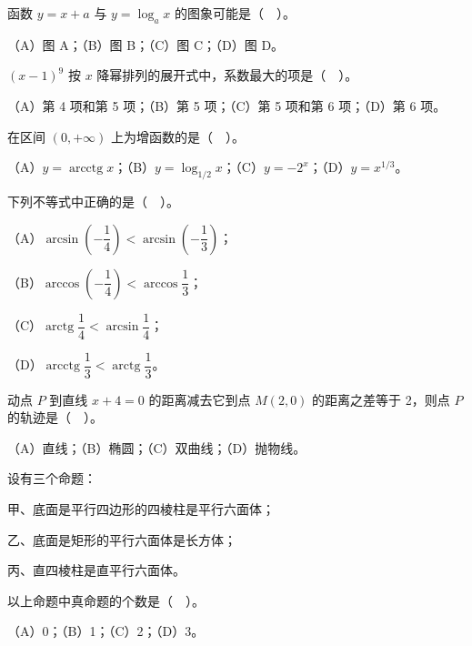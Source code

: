 \Needspace{0.4\textheight}
\begin{question}
函数 $y=x+a$ 与 $y=\log_a x$ 的图象可能是（　）。

（A）图 A；（B）图 B；（C）图 C；（D）图 D。
\nopagebreak[4]
\begin{center}\end{center}
\nopagebreak[4]
\end{question}
\begin{question}
$(x-1)^9$ 按 $x$ 降幂排列的展开式中，系数最大的项是（　）。

（A）第 4 项和第 5 项；（B）第 5 项；（C）第 5 项和第 6 项；（D）第 6 项。

\end{question}
\begin{question}
在区间 $(0,+\infty)$ 上为增函数的是（　）。

（A）$y=\operatorname{arcctg}x$；（B）$y=\log_{1/2}x$；（C）$y=-2^x$；（D）$y=x^{1/3}$。

\end{question}
\begin{question}
下列不等式中正确的是（　）。

（A）$\arcsin\left(-\dfrac14\right)<\arcsin\left(-\dfrac13\right)$；

（B）$\arccos\left(-\dfrac14\right)<\arccos\dfrac13$；

（C）$\operatorname{arctg}\dfrac14<\arcsin\dfrac14$；

（D）$\operatorname{arcctg}\dfrac13<\operatorname{arctg}\dfrac13$。

\end{question}
\begin{question}
动点 $P$ 到直线 $x+4=0$ 的距离减去它到点 $M(2,0)$ 的距离之差等于 2，则点 $P$ 的轨迹是（　）。

（A）直线；（B）椭圆；（C）双曲线；（D）抛物线。

\end{question}
\begin{question}
设有三个命题：

甲、底面是平行四边形的四棱柱是平行六面体；

乙、底面是矩形的平行六面体是长方体；

丙、直四棱柱是直平行六面体。

以上命题中真命题的个数是（　）。

（A）0；（B）1；（C）2；（D）3。

\end{question}
